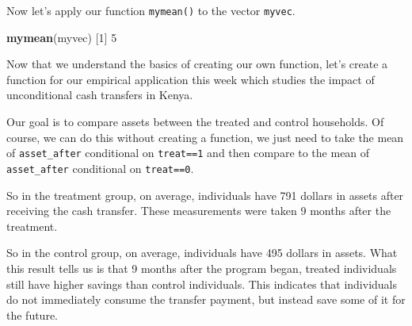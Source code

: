 \documentclass[
]{book}
\newenvironment{Shaded}{\begin{snugshade}}{\end{snugshade}}
\newcommand{\DecValTok}[1]{\textcolor[rgb]{0.00,0.00,0.81}{#1}}
\newcommand{\FloatTok}[1]{\textcolor[rgb]{0.00,0.00,0.81}{#1}}
\newcommand{\FunctionTok}[1]{\textcolor[rgb]{0.13,0.29,0.53}{\textbf{#1}}}
\newcommand{\NormalTok}[1]{#1}
\newcommand{\SpecialCharTok}[1]{\textcolor[rgb]{0.81,0.36,0.00}{\textbf{#1}}}
\begin{document}
Now let's apply our function \texttt{mymean()} to the vector \texttt{myvec}.

\begin{Shaded}
\begin{Highlighting}[]
\FunctionTok{mymean}\NormalTok{(myvec)}
\NormalTok{[}\DecValTok{1}\NormalTok{] }\DecValTok{5}
\end{Highlighting}
\end{Shaded}

Now that we understand the basics of creating our own function, let's create a function for our empirical application this week which studies the impact of unconditional cash transfers in Kenya.

Our goal is to compare assets between the treated and control households. Of course, we can do this without creating a function, we just need to take the mean of \texttt{asset\_after} conditional on \texttt{treat==1} and then compare to the mean of \texttt{asset\_after} conditional on \texttt{treat==0}.

\begin{Shaded}
\end{Shaded}

So in the treatment group, on average, individuals have 791 dollars in assets after receiving the cash transfer. These measurements were taken 9 months after the treatment.

\begin{Shaded}
\end{Shaded}

So in the control group, on average, individuals have 495 dollars in assets. What this result tells us is that 9 months after the program began, treated individuals still have higher savings than control individuals. This indicates that individuals do not immediately consume the transfer payment, but instead save some of it for the future.
\end{document}
